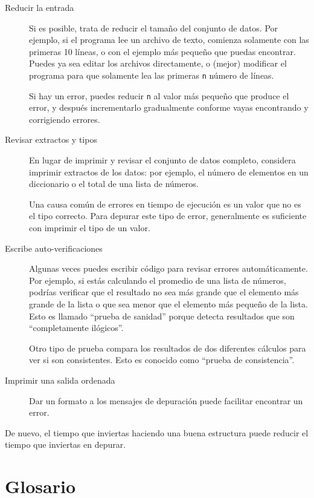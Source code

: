 \begin{description}
\item[Reducir la entrada]
Si es posible, trata de reducir el tamaño del conjunto de datos. Por
ejemplo, si el programa lee un archivo de texto, comienza solamente con
las primeras 10 líneas, o con el ejemplo más pequeño que puedas
encontrar. Puedes ya sea editar los archivos directamente, o (mejor)
modificar el programa para que solamente lea las primeras \texttt{n}
número de líneas.

Si hay un error, puedes reducir \texttt{n} al valor más pequeño que
produce el error, y después incrementarlo gradualmente conforme vayas
encontrando y corrigiendo errores.
\item[Revisar extractos y tipos]
En lugar de imprimir y revisar el conjunto de datos completo, considera
imprimir extractos de los datos: por ejemplo, el número de elementos en
un diccionario o el total de una lista de números.

Una causa común de errores en tiempo de ejecución es un valor que no es
el tipo correcto. Para depurar este tipo de error, generalmente es
suficiente con imprimir el tipo de un valor.
\item[Escribe auto-verificaciones]
Algunas veces puedes escribir código para revisar errores
automáticamente. Por ejemplo, si estás calculando el promedio de una
lista de números, podrías verificar que el resultado no sea más grande
que el elemento más grande de la lista o que sea menor que el elemento
más pequeño de la lista. Esto es llamado ``prueba de sanidad'' porque
detecta resultados que son ``completamente ilógicos''.
 

Otro tipo de prueba compara los resultados de dos diferentes cálculos
para ver si son consistentes. Esto es conocido como ``prueba de
consistencia''.
\item[Imprimir una salida ordenada]
Dar un formato a los mensajes de depuración puede facilitar encontrar un
error.
\end{description}

De nuevo, el tiempo que inviertas haciendo una buena estructura puede
reducir el tiempo que inviertas en depurar. 

\hypertarget{glosario}{%
\section{Glosario}\label{glosario}}

